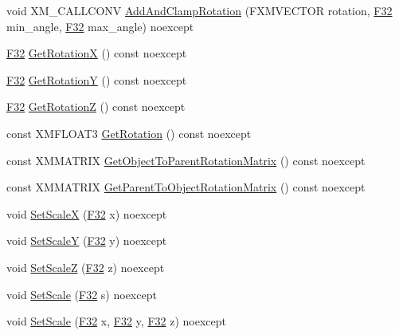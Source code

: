 \begin{DoxyCompactItemize}
\item 
void X\+M\+\_\+\+C\+A\+L\+L\+C\+O\+NV \hyperlink{structmage_1_1_transform_node_a9d29e51f8cc61aef4ebbe311d27981b2}{Add\+And\+Clamp\+Rotation} (F\+X\+M\+V\+E\+C\+T\+OR rotation, \hyperlink{namespacemage_aa97e833b45f06d60a0a9c4fc22ae02c0}{F32} min\+\_\+angle, \hyperlink{namespacemage_aa97e833b45f06d60a0a9c4fc22ae02c0}{F32} max\+\_\+angle) noexcept
\item 
\hyperlink{namespacemage_aa97e833b45f06d60a0a9c4fc22ae02c0}{F32} \hyperlink{structmage_1_1_transform_node_a716a289997267d8bcda1da28cb679dcc}{Get\+RotationX} () const noexcept
\item 
\hyperlink{namespacemage_aa97e833b45f06d60a0a9c4fc22ae02c0}{F32} \hyperlink{structmage_1_1_transform_node_a620a6a7d11b3541f17e0492fdf48d9ab}{Get\+RotationY} () const noexcept
\item 
\hyperlink{namespacemage_aa97e833b45f06d60a0a9c4fc22ae02c0}{F32} \hyperlink{structmage_1_1_transform_node_a3c08b93f62e5d741c95a97ae9b42e039}{Get\+RotationZ} () const noexcept
\item 
const X\+M\+F\+L\+O\+A\+T3 \hyperlink{structmage_1_1_transform_node_ae785911d718434387199a92c6966a9b7}{Get\+Rotation} () const noexcept
\item 
const X\+M\+M\+A\+T\+R\+IX \hyperlink{structmage_1_1_transform_node_a07d6171d757d2f7fbf0d2d59dbe531d9}{Get\+Object\+To\+Parent\+Rotation\+Matrix} () const noexcept
\item 
const X\+M\+M\+A\+T\+R\+IX \hyperlink{structmage_1_1_transform_node_a6a5c82910f5f6395a74bddf3d564547c}{Get\+Parent\+To\+Object\+Rotation\+Matrix} () const noexcept
\item 
void \hyperlink{structmage_1_1_transform_node_aba40e52810cbc4ef0db933ce771b1fac}{Set\+ScaleX} (\hyperlink{namespacemage_aa97e833b45f06d60a0a9c4fc22ae02c0}{F32} x) noexcept
\item 
void \hyperlink{structmage_1_1_transform_node_a8292656dfac20ee5e8b9c3e302b1fa6a}{Set\+ScaleY} (\hyperlink{namespacemage_aa97e833b45f06d60a0a9c4fc22ae02c0}{F32} y) noexcept
\item 
void \hyperlink{structmage_1_1_transform_node_a39587e5bfaffdaef7800addc6748062f}{Set\+ScaleZ} (\hyperlink{namespacemage_aa97e833b45f06d60a0a9c4fc22ae02c0}{F32} z) noexcept
\item 
void \hyperlink{structmage_1_1_transform_node_ab0d7ee104cc1815ce89b09fac56e9a1d}{Set\+Scale} (\hyperlink{namespacemage_aa97e833b45f06d60a0a9c4fc22ae02c0}{F32} s) noexcept
\item 
void \hyperlink{structmage_1_1_transform_node_a66336ad1e8afafafca4f4b78f874bad9}{Set\+Scale} (\hyperlink{namespacemage_aa97e833b45f06d60a0a9c4fc22ae02c0}{F32} x, \hyperlink{namespacemage_aa97e833b45f06d60a0a9c4fc22ae02c0}{F32} y, \hyperlink{namespacemage_aa97e833b45f06d60a0a9c4fc22ae02c0}{F32} z) noexcept

\end{DoxyCompactItemize}
